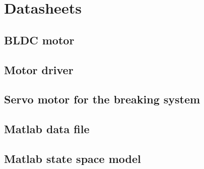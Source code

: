 

\section {Datasheets}\label{app:data}

\pagebreak
\subsection{BLDC motor}\label{app:motor}

\begin{figure}[H]
	\centering

\end{figure}

\pagebreak
\subsection{Motor driver}\label{app:driver}

\begin{figure}[H]
	\centering
	
\end{figure}
\pagebreak
\begin{figure}[H]
	\centering
	
\end{figure}
\pagebreak
\begin{figure}[H]
	\centering
	
\end{figure}

\pagebreak
\subsection{Servo motor for the breaking system}\label{app:servo}
\begin{figure}[H]
	\centering
	
\end{figure}


\pagebreak
\subsection{Matlab data file}\label{app:matlabdata}




\pagebreak
\subsection{Matlab state space model}\label{app:SS}






